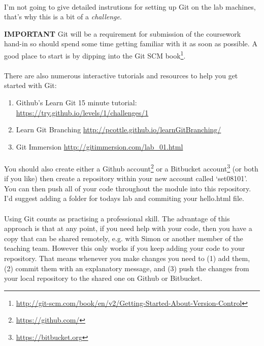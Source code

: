 \documentclass[10pt, a4paper]{article}
\begin{document}
\paragraph{} I'm not going to give detailed instrutions for setting up Git on the lab machines, that's why this is a bit of a \emph{challenge}.

\begin{framed}
\textbf{IMPORTANT} Git will be a requirement for submission of the coursework hand-in so should spend some time getting familiar with it as soon as possible. A good place to start is by dipping into the Git SCM book\footnote{\url{http://git-scm.com/book/en/v2/Getting-Started-About-Version-Control}}.
\end{framed}

\paragraph{} There are also numerous interactive tutorials and resources to help you get started with Git:
\begin{enumerate}
\item Github's Learn Git 15 minute tutorial: \url{https://try.github.io/levels/1/challenges/1}
\item Learn Git Branching \url{http://pcottle.github.io/learnGitBranching/}
\item Git Immersion \url{http://gitimmersion.com/lab_01.html}
\end{enumerate}

\paragraph{} You should also create either a Github account\footnote{\url{https://github.com/}} or a Bitbucket account\footnote{\url{https://bitbucket.org}} (or both if you like) then create a repository within your new account called `set08101'. You can then push all of your code throughout the module into this repository. I'd suggest adding a folder for todays lab and commiting your hello.html file. 

\paragraph{} Using Git counts as practising a professional skill. The advantage of this approach is that at any point, if you need help with your code, then you have a copy that can be shared remotely, e.g. with Simon or another member of the teaching team. However this only works if you keep adding your code to your repository. That means whenever you make changes you need to (1) add them, (2) commit them with an explanatory message,  and (3) push the changes from your local repository to the shared one on Github or Bitbucket.







\end{document}
